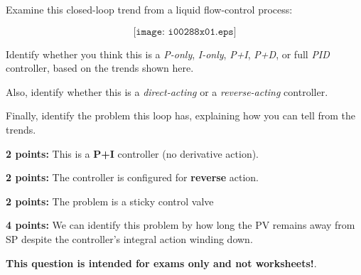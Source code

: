 

Examine this closed-loop trend from a liquid flow-control process:

$$\texttt{[image: i00288x01.eps]}$$

Identify whether you think this is a {\it P-only}, {\it I-only}, {\it P+I}, {\it P+D}, or full {\it PID} controller, based on the trends shown here.

\vskip 10pt

Also, identify whether this is a {\it direct-acting} or a {\it reverse-acting} controller.

\vskip 10pt

Finally, identify the problem this loop has, explaining how you can tell from the trends.

\vskip 50pt







{\bf 2 points:} This is a {\bf P+I} controller (no derivative action).  

\vskip 10pt

{\bf 2 points:} The controller is configured for {\bf reverse} action.

\vskip 10pt

{\bf 2 points:} The problem is a sticky control valve

\vskip 10pt

{\bf 4 points:} We can identify this problem by how long the PV remains away from SP despite the controller's integral action winding down.







{\bf This question is intended for exams only and not worksheets!}.



